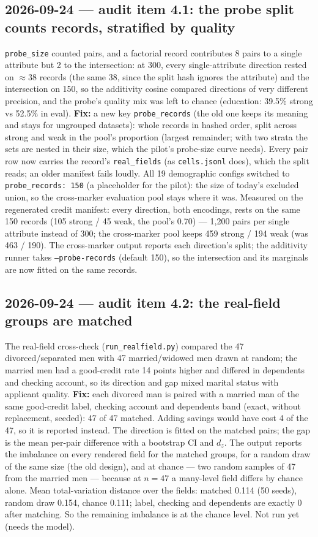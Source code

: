 \documentclass{article}
\begin{document}
\subsection*{2026-09-24 --- audit item 4.1: the probe split counts records, stratified by quality}
\texttt{probe\_size} counted pairs, and a factorial record contributes 8 pairs to a single attribute but 2 to the
intersection: at 300, every single-attribute direction rested on $\approx$38 records (the same 38, since the split
hash ignores the attribute) and the intersection on 150, so the additivity cosine compared directions of very
different precision, and the probe's quality mix was left to chance (education: 39.5\% strong vs 52.5\% in eval).
\textbf{Fix:} a new key \texttt{probe\_records} (the old one keeps its meaning and stays for ungrouped datasets):
whole records in hashed order, split across strong and weak in the pool's proportion (largest remainder; with two
strata the sets are nested in their size, which the pilot's probe-size curve needs). Every pair row now carries
the record's \texttt{real\_fields} (as \texttt{cells.jsonl} does), which the split reads; an older manifest fails
loudly. All 19 demographic configs switched to \texttt{probe\_records: 150} (a placeholder for the pilot):
the size of today's excluded union, so the cross-marker evaluation pool stays where it was. Measured on the
regenerated credit manifest: every direction, both encodings, rests on the same 150 records (105 strong / 45 weak,
the pool's 0.70) --- 1{,}200 pairs per single attribute instead of 300; the cross-marker pool keeps 459 strong /
194 weak (was 463 / 190). The cross-marker output reports each direction's split; the additivity runner takes
\texttt{--probe-records} (default 150), so the intersection and its marginals are now fitted on the same records.

\subsection*{2026-09-24 --- audit item 4.2: the real-field groups are matched}
The real-field cross-check (\texttt{run\_realfield.py}) compared the 47 divorced/separated men with 47
married/widowed men drawn at random; the married men had a good-credit rate 14 points higher and differed in
dependents and checking account, so its direction and gap mixed marital status with applicant quality.
\textbf{Fix:} each divorced man is paired with a married man of the same good-credit label, checking account
and dependents band (exact, without replacement, seeded): 47 of 47 matched. Adding savings would have cost 4 of
the 47, so it is reported instead. The direction is fitted on the matched pairs; the gap is the mean per-pair
difference with a bootstrap CI and $d_z$. The output reports the imbalance on every rendered field for the
matched groups, for a random draw of the same size (the old design), and at chance --- two random samples of 47
from the married men --- because at $n{=}47$ a many-level field differs by chance alone. Mean total-variation
distance over the fields: matched 0.114 (50 seeds), random draw 0.154, chance 0.111; label, checking and
dependents are exactly 0 after matching. So the remaining imbalance is at the chance level. Not run yet (needs
the model).
\end{document}
